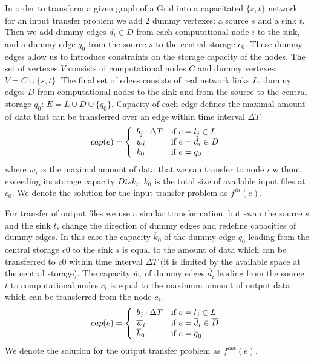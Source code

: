 In order to transform a given graph of a Grid into a capacitated $\{s,t\}$ network for an input transfer problem we add 2 dummy vertexes: a source $s$ and a sink $t$. Then we add  dummy edges $d_{i} \in D$ from each computational node $i$ to the sink, and a dummy edge $q_{0}$ from the source $s$ to the central storage $c_{0}$. These dummy edges allow us to introduce constraints on the storage capacity of the nodes. The set of vertexes $V$ consists of computational nodes $C$ and dummy vertexes: $V= C \cup \{s,t\}$. The final set of edges consists of real network links $L$, dummy edges $D$ from computational nodes to the sink and from the source to the central storage $q_{0}$: $E= L \cup D \cup \{q_{0}\}$. Capacity of each edge defines the maximal amount of data that can be transferred over an edge within time interval $\Delta T$: 
\begin{equation}
\label{edge_cap}
cap(e) = \left\{ 
  \begin{array}{l l}
    b_{j} \cdot \Delta T & \text{if }e = l_{j} \in L \\
    w_{i} & \text{if } e = d_{i} \in D\\
    k_{0} & \text{if } e = q_{0}
  \end{array} \right.
\end{equation}
where $w_{i}$ is the maximal amount of data that we can transfer to node $i$ without exceeding its storage capacity $Disk_{i}$, $k_{0}$ is the total size of available input files at $c_{0}$. We denote the solution for the input transfer problem as $f^{in}(e)$.

For transfer of output files we use a similar transformation, but swap the source $s$ and the sink $t$, change the direction of dummy edges and redefine capacities of dummy edges. In this case the capacity $\overline{k}_{0}$ of the dummy edge $\overline{q}_{0}$ leading from the central storage $c0$ to the sink $s$ is equal to the amount of data which can be transferred to $c0$ within time interval $\Delta T$ (it is limited by the available space at the central storage). The capacity $\overline{w}_{i}$ of dummy edges $\overline{d}_{i}$ leading from the source $t$ to computational nodes $c_{i}$ is equal to the maximum amount of output data which can be transferred from the node $c_{i}$.
\begin{equation}
\label{edge_cap_out}
cap(e) = \left\{ 
  \begin{array}{l l}
    b_{j} \cdot \Delta T & \text{if }e = l_{j} \in L \\
    \overline{w}_{i} & \text{if } e = \overline{d}_{i} \in \overline{D}\\
    \overline{k}_{0} & \text{if } e = \overline{q}_{0}
  \end{array} \right.
\end{equation}
We denote the solution for the output transfer problem as $f^{out}(e)$.

